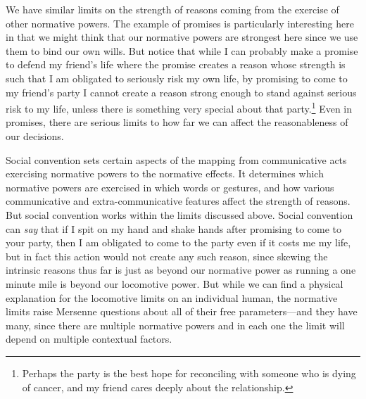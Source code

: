 We have similar limits on the strength of reasons coming from the exercise of other normative powers. The example of
promises is particularly interesting here in that we might think that our normative powers are strongest here since 
we use them to bind our own wills. But notice that while I can probably make a promise to defend my friend's life 
where the promise creates a reason whose strength is such that I am obligated to seriously risk my own life, by promising
to come to my friend's party I cannot create a reason strong enough to stand against serious risk to my life, unless
there is something very special about that party.\footnote{Perhaps the party is the best hope for reconciling with 
someone who is dying of cancer, and my friend cares deeply about the relationship.} Even in promises, there are 
serious limits to how far we can affect the reasonableness of our decisions. 

Social convention sets certain aspects of the mapping from communicative acts exercising normative powers to the normative
effects. It determines which normative powers are exercised in which words or gestures, and how various communicative and
extra-communicative features affect the strength of reasons. But social convention works within the limits discussed
above. Social convention can \textit{say} that if I spit on my hand and shake hands after promising to come to your
party, then I am obligated to come to the party even if it costs me my life, but in fact this action would not create
any such reason, since skewing the intrinsic reasons thus far is just as beyond our normative power as running a one minute
mile is beyond our locomotive power. But while we can find a physical explanation for the locomotive limits on an 
individual human, the normative limits raise Mersenne questions about all of their free parameters---and they have many,
since there are multiple normative powers and in each one the limit will depend on multiple contextual factors.

